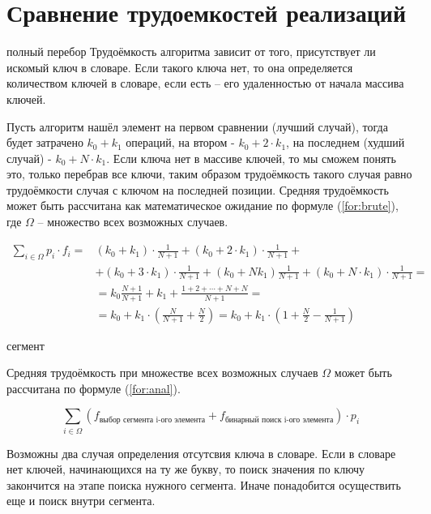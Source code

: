 \section{Сравнение трудоемкостей реализаций}
полный перебор
Трудоёмкость алгоритма зависит от того, присутствует ли искомый ключ в словаре. Если такого ключа нет, то она определяется количеством ключей в словаре, если есть -- его удаленностью от начала массива ключей.

Пусть алгоритм нашёл элемент на первом сравнении (лучший случай), тогда будет затрачено $k_0 + k_1$ операций, на втором - $k_0 + 2 \cdot k_1$, на последнем (худший случай) - $k_0 + N \cdot k_1$. Если ключа нет в массиве ключей, то мы сможем понять это, только перебрав все ключи, таким образом трудоёмкость такого случая равно трудоёмкости случая с ключом на последней позиции. Средняя трудоёмкость может быть рассчитана как математическое ожидание по формуле (\ref{for:brute}), где $\Omega$ -- множество всех возможных случаев.

\begin{equation}
	\label{for:brute}
	\begin{aligned}
		\sum\limits_{i \in \Omega} p_i \cdot f_i = & (k_0 + k_1) \cdot \frac{1}{N + 1} + (k_0 + 2 \cdot k_1) \cdot \frac{1}{N+1} +\\
		& + (k_0 + 3 \cdot k_1) \cdot \frac{1}{N + 1} + (k_0 + Nk_1)\frac{1}{N + 1} + (k_0 + N \cdot k_1) \cdot \frac{1}{N + 1} =\\
		& = k_0\frac{N+1}{N+1}+k_1+\frac{1 + 2 + \cdots + N + N}{N + 1} = \\
		& = k_0 + k_1 \cdot \left(\frac{N}{N + 1} + \frac{N}{2}\right) = k_0 + k_1 \cdot \left(1 + \frac{N}{2} - \frac{1}{N + 1}\right)
	\end{aligned}
\end{equation}

сегмент

Средняя трудоёмкость при множестве всех возможных случаев $\Omega$ может быть рассчитана по формуле (\ref{for:anal}). 

\begin{equation}
	\label{for:anal}
	\sum_{i \in \Omega}{\left(f_{\text{выбор сегмента i-ого элемента}} + f_{\text{бинарный поиск i-ого элемента}}\right)} \cdot p_i
\end{equation}

Возможны два случая определения отсутсвия ключа в словаре. Если в словаре нет ключей, начинающихся на ту же букву, то поиск значения по ключу закончится на этапе поиска нужного сегмента. Иначе понадобится осуществить еще и поиск внутри сегмента.


